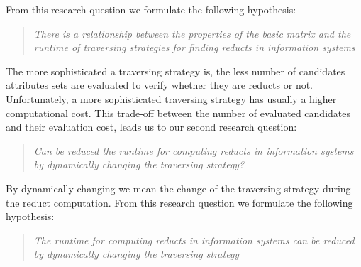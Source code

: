 \documentclass[authoryear,11pt]{elsarticle}
\begin{document}
  From this research question we formulate the following hypothesis:
  
\begin{quote}  
  \emph{There is a relationship between the properties of the basic matrix and the runtime 
  		of traversing strategies for finding reducts in information systems}
\end{quote}
  		
%  
%
%    
  
  The more sophisticated a traversing strategy is, the less number of candidates attributes sets are 
  evaluated to verify whether they are reducts or not. Unfortunately, a more sophisticated traversing 
  strategy has usually a higher computational cost. This trade-off between the number of evaluated 
  candidates and their evaluation cost, leads us to our second research question:
  
\begin{quote}
  \emph{Can be reduced the runtime for computing reducts in information systems by 
  		dynamically changing the traversing strategy?}
\end{quote}
  By dynamically changing we mean the change of the traversing strategy during the reduct computation.
  From this research question we formulate the following hypothesis:
    
\begin{quote}
  \emph{The runtime for computing reducts in information systems can be reduced by 
  		dynamically changing the traversing strategy}
\end{quote}
\end{document}
